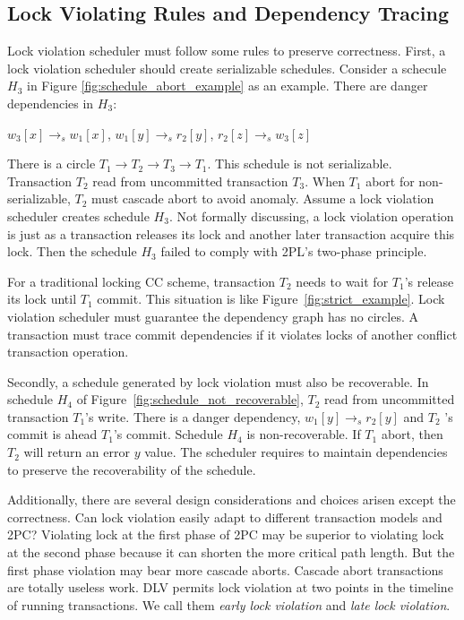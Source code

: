 \documentclass[conference]{IEEEtran}
\begin{document}
\subsection{Lock Violating Rules and Dependency Tracing}

Lock violation scheduler must follow some rules to preserve correctness.
First, a lock violation scheduler should create serializable schedules.
Consider a schecule ${H_3}$ in Figure \ref{fig:schedule_abort_example} as an example.
There are danger dependencies in ${H_3}$:

\begin{center}
  ${w_3[x] \rightarrow _s w_1[x]}$, 
${w_1[y] \rightarrow _s r_2[y]}$,
${r_2[z] \rightarrow _s w_3[z]}$
\end{center}

There is a circle ${T_1 \rightarrow T_2 \rightarrow T_3 \rightarrow T_1}$.
This schedule is not serializable.
Transaction ${T_2}$
read from uncommitted transaction ${T_3}$.
When ${T_1}$ abort for non-serializable, ${T_2}$ must cascade abort to avoid anomaly.
Assume a lock violation scheduler creates schedule ${H_3}$.
Not formally discussing, a lock violation operation is just as a transaction releases its lock and another later transaction acquire this lock.
Then the schedule ${H_3}$ failed to comply with 2PL's two-phase principle.

For a traditional locking CC scheme, transaction ${T_2}$ needs to wait for ${T_1}$'s release its lock until ${T_1}$ commit.
This situation is like Figure~\ref{fig:strict_example}.
Lock violation scheduler must guarantee the dependency graph has no circles.
A transaction must trace commit dependencies if it violates locks of another conflict transaction operation.

Secondly, a schedule generated by lock violation must also be recoverable.
In schedule ${H_4}$ of Figure~\ref{fig:schedule_not_recoverable}, 
${T_2}$ read from uncommitted transaction ${T_1}$'s write.
There is a danger dependency, ${w_1[y] \rightarrow_s r_2[y]}$ and ${T_2}$ 's commit is ahead ${T_1}$'s commit.
Schedule ${H_4}$ is non-recoverable.
If ${T_1}$ abort, then ${T_2}$ will return an error ${y}$ value.
The scheduler requires to maintain dependencies to preserve the recoverability of the schedule. 


Additionally, there are several design considerations and choices arisen except the correctness.
Can lock violation easily adapt to different transaction models and 2PC?
Violating lock at the first phase of 2PC may be superior to violating lock at the second phase because it can shorten the more critical path length.
But the first phase violation may bear more cascade aborts.
Cascade abort transactions are totally useless work.
DLV permits lock violation at two points in the timeline of running transactions.
We call them \emph{early lock violation} and \emph{late lock violation}.
\end{document}
